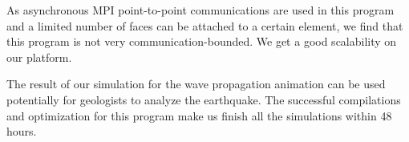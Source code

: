 \documentclass[5p,times]{sig-alternate-05-2015}
\begin{document}

As asynchronous MPI point-to-point communications are used in this program and a limited number of faces can be attached to a certain element, we find that this program is not very communication-bounded. We get a good scalability on our platform.

The result of our simulation for the wave propagation animation can be used potentially for geologists to analyze the earthquake. The successful compilations and optimization for this program make us finish all the simulations within 48 hours.



\end{document}
